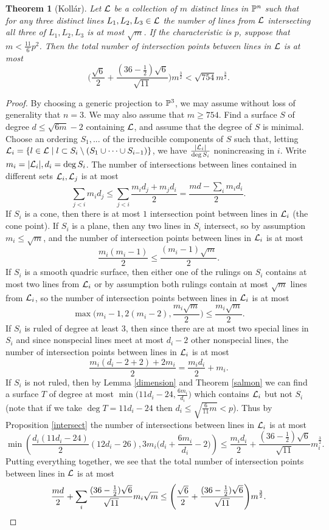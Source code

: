 \documentclass[letterpaper,11pt]{article}
\newtheorem{thm}{Theorem}
\theoremstyle{definition}
\theoremstyle{remark}
\begin{document}
\begin{thm}[Koll\'ar]\label{3d} Let $\mathcal{L}$ be a collection of $m$ distinct lines in $\mathbb{P}^n$ such that for any three distinct lines $L_1,L_2,L_3 \in \mathcal{L}$ the number of lines from $\mathcal{L}$ intersecting all three of $L_1,L_2,L_3$ is at most $\sqrt{m}$. If the characteristic is $p$, suppose that $m < \frac{11}{6}p^2$. Then the total number of intersection points between lines in $\mathcal{L}$ is at most
\[
\Bigg(\frac{\sqrt{6}}{2}+\frac{(36-\frac{1}{2})\sqrt{6}}{\sqrt{11}}\Bigg)m^{\frac{3}{2}} < \sqrt{754}m^{\frac{3}{2}}.
\]
\end{thm}
\begin{proof} By choosing a generic projection to $\mathbb{P}^3$, we may assume without loss of generality that $n = 3$. We may also assume that $m\ge 754$. Find a surface $S$ of degree $d \le \sqrt{6m}-2$ containing $\mathcal{L}$, and assume that the degree of $S$ is minimal. Choose an ordering $S_1, ...$ of the irreducible components of $S$ such that, letting $\mathcal{L}_i = \{l \in \mathcal{L} \mid l \subset S_i\setminus (S_1\cup\cdots\cup S_{i-1})\}$, we have $\frac{|\mathcal{L}_i|}{\deg S_i}$ nonincreasing in $i$. Write $m_i = |\mathcal{L}_i|, d_i = \deg S_i$. The number of intersections between lines contained in different sets $\mathcal{L}_i, \mathcal{L}_j$ is at most
\[
\sum_{j<i} m_id_j \le \sum_{j<i} \frac{m_id_j + m_jd_i}{2} = \frac{md - \sum_i m_id_i}{2}.
\]
If $S_i$ is a cone, then there is at most $1$ intersection point between lines in $\mathcal{L}_i$ (the cone point). If $S_i$ is a plane, then any two lines in $S_i$ intersect, so by assumption $m_i \le \sqrt{m}$, and the number of intersection points between lines in $\mathcal{L}_i$ is at most
\[
\frac{m_i(m_i-1)}{2} \le \frac{(m_i-1)\sqrt{m}}{2}.
\]
If $S_i$ is a smooth quadric surface, then either one of the rulings on $S_i$ contains at most two lines from $\mathcal{L}_i$ or by assumption both rulings contain at most $\sqrt{m}$ lines from $\mathcal{L}_i$, so the number of intersection points between lines in $\mathcal{L}_i$ is at most
\[
\max\bigg(m_i-1,2(m_i-2),\frac{m_i\sqrt{m}}{2}\bigg) \le \frac{m_i\sqrt{m}}{2}.
\]
If $S_i$ is ruled of degree at least $3$, then since there are at most two special lines in $S_i$ and since nonspecial lines meet at most $d_i-2$ other nonspecial lines, the number of intersection points between lines in $\mathcal{L}_i$ is at most
\[
\frac{m_i(d_i-2+2)+2m_i}{2} = \frac{m_id_i}{2} + m_i.
\]
If $S_i$ is not ruled, then by Lemma \ref{dimension} and Theorem \ref{salmon} we can find a surface $T$ of degree at most $\min\big(11d_i-24,\frac{6m_i}{d_i}\big)$ which contains $\mathcal{L}_i$ but not $S_i$ (note that if we take $\deg T = 11d_i-24$ then $d_i \le \sqrt{\frac{6}{11}m} < p$). Thus by Proposition \ref{intersect} the number of intersections between lines in $\mathcal{L}_i$ is at most
\[
\min\left(\frac{d_i(11d_i-24)}{2}(12d_i-26), 3m_i\Big(d_i + \frac{6m_i}{d_i}-2\Big)\right) \le \frac{m_id_i}{2}+\frac{(36-\frac{1}{2})\sqrt{6}}{\sqrt{11}}m_i^{\frac{3}{2}}.
\]
Putting everything together, we see that the total number of intersection points between lines in $\mathcal{L}$ is at most
\[
\frac{md}{2}+\sum_i \frac{(36-\frac{1}{2})\sqrt{6}}{\sqrt{11}}m_i\sqrt{m} \le \Bigg(\frac{\sqrt{6}}{2}+\frac{(36-\frac{1}{2})\sqrt{6}}{\sqrt{11}}\Bigg)m^{\frac{3}{2}}.\qedhere
\]
\end{proof}
\end{document}
